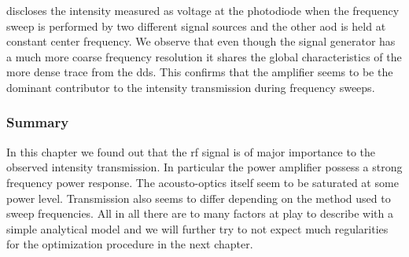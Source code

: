  discloses the intensity
measured as voltage at the photodiode when the frequency sweep is performed
by two different signal sources and the other \gls{aod} is held at constant
center frequency. We observe that even though the signal generator has a much
more coarse frequency resolution it shares the global characteristics of
the more dense trace from the \gls{dds}. This confirms that the amplifier
seems to be the dominant contributor to the intensity transmission during
frequency sweeps.

\subsubsection{Summary}

In this chapter we found out that the \gls{rf} signal is of major importance
to the observed intensity transmission. In particular the power amplifier
possess a strong frequency power response. The acousto-optics itself seem to
be saturated at some power level. Transmission also seems to differ depending
on the method used to sweep frequencies. All in all there are to many factors
at play to describe with a simple analytical model and we will further try to
not expect much regularities for the optimization procedure in the next
chapter.
